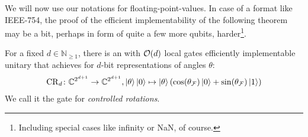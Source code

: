 We will now use our notations for floating-point-values. In case of a format like IEEE-754, the proof of the efficient implementability of the following theorem may be a bit, perhaps in form of quite a few more qubits, harder\footnote{Including special cases like infinity or NaN, of course.}.
\begin{lemma} \label{controlled_rotation}
    For a fixed \(d \in \mathbb{N}_{\geq 1}\), there is an with \(\operatorname{\mathcal{O}}(d)\) local gates efficiently implementable unitary that achieves for \(d\)-bit representations of angles \(\theta\):
    \begin{align}
        \operatorname{CR}_d\colon \mathbb{C}^{2^{d+1}} \to \mathbb{C}^{2^{d+1}}, \ket{\theta}\ket{0} \mapsto \ket{\theta}(\cos(\theta_{\mathcal{F}})\ket{0}+\sin(\theta_{\mathcal{F}})\ket{1})
    \end{align}
    We call it the gate for \emph{controlled rotations}.
\end{lemma}
